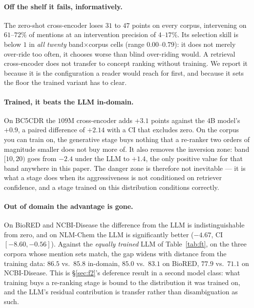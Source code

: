 \documentclass[11pt]{article}
\begin{document}
\paragraph{Off the shelf it fails, informatively.} The zero-shot cross-encoder loses
$31$ to $47$ points on every corpus, intervening on $61$--$72\%$ of mentions at an
intervention precision of $4$--$17\%$. Its selection skill is below $1$ in
\emph{all twenty} band$\times$corpus cells (range $0.00$--$0.79$): it does not merely
over-ride too often, it chooses worse than blind over-riding would. A retrieval
cross-encoder does not transfer to concept ranking without training. We report it
because it is the configuration a reader would reach for first, and because it sets the
floor the trained variant has to clear.

\paragraph{Trained, it beats the LLM in-domain.} On BC5CDR the $109$M cross-encoder adds
$+3.1$ points against the $4$B model's $+0.9$, a paired difference of $+2.14$ with a CI
that excludes zero. On the corpus you can train on, the generative stage buys nothing
that a re-ranker two orders of magnitude smaller does not buy more of. It also removes
the inversion zone: band $[10,20)$ goes from $-2.4$ under the LLM to $+1.4$, the only
positive value for that band anywhere in this paper. The danger zone is therefore not
inevitable --- it is what a stage does when its aggressiveness is not conditioned on
retriever confidence, and a stage trained on this distribution conditions correctly.

\paragraph{Out of domain the advantage is gone.} On BioRED and NCBI-Disease the
difference from the LLM is indistinguishable from zero, and on NLM-Chem the LLM is
significantly better ($-4.67$, CI $[-8.60,-0.56]$). Against the \emph{equally trained}
LLM of Table~\ref{tab:ft}, on the three corpora whose mention sets match, the gap widens
with distance from the training data: $86.5$ vs.\ $85.8$ in-domain, $85.0$ vs.\ $83.1$
on BioRED, $77.9$ vs.\ $71.1$ on NCBI-Disease. This is \S\ref{sec:f2}'s deference
result in a second model class: what training buys a re-ranking stage is bound to the
distribution it was trained on, and the LLM's residual contribution is transfer rather
than disambiguation as such.
\end{document}
